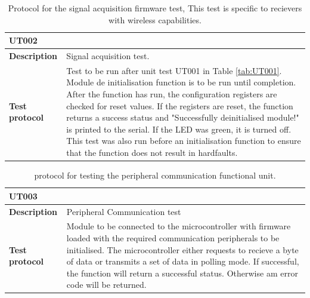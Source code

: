 \begin{table}[H]
	\centering
	\caption{Protocol for the signal acquisition firmware test, This test is specific to recievers with wireless capabilities. }
		\setlength{\extrarowheight}{5pt}
	\label{tab:UT002}
	\begin{tabular}{m{} m{}}
		\multicolumn{2}{l}{\textbf{UT002} }\\
		\hline
		\textbf{Description} & Signal acquisition test.\\
		\hline
		\hline
		\textbf{Test protocol} & Test to be run after unit test UT001 in Table \ref{tab:UT001}. Module de initialisation function is to be run until completion. After the function has run, the configuration registers are checked for reset values. If the registers are reset, the function returns a success status and "Successfully deinitialised module!" is printed to the serial. If the LED was green, it is turned off. This test was also run before an initialisation function to ensure that the function does not result in hardfaults.\\
		\hline
		\hline
	\end{tabular}
\end{table}

\begin{table}[H]
	\centering
	\caption{protocol for testing the peripheral communication functional unit.}
	\setlength{\textwidth}{5pt}
	\label{tab:UT003}
	\begin{tabular}{m{} m{}}
		\multicolumn{2}{l}{\textbf{UT003} }\\
		\hline
		\textbf{Description} & Peripheral Communication test\\
		\hline
		\hline
		\textbf{Test protocol} & Module to be connected to the microcontroller with firmware loaded with the required communication peripherals to be initialised. The microcontroller either requests to recieve a byte of data or transmits a set of data in polling mode. If successful, the function will return a successful status. Otherwise am error code will be returned.  \\
		\hline
		\hline
	\end{tabular}
\end{table}

